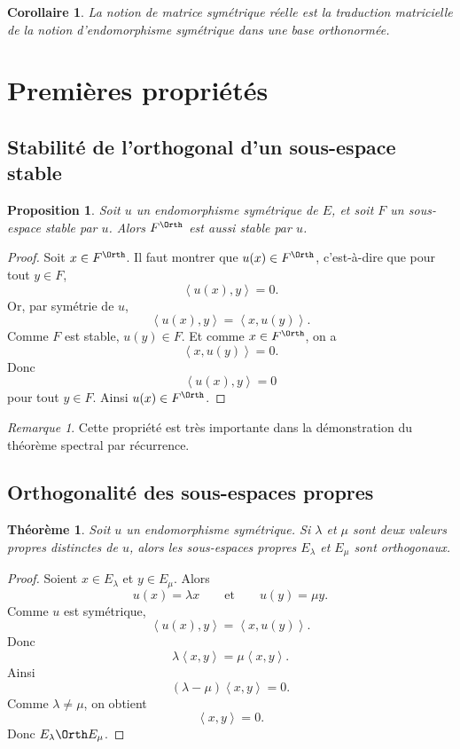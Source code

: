 \documentclass[11pt,a4paper]{article}
\newtheorem{theoreme}[definition]{Théorème}
\newtheorem{proposition}[definition]{Proposition}
\newtheorem{corollaire}[definition]{Corollaire}
\theoremstyle{remark}
\newtheorem{remarque}[definition]{Remarque}
\newcommand{\scal}[2]{\left\langle #1,#2\right\rangle}
\begin{document}
\begin{corollaire}
La notion de matrice symétrique réelle est la traduction matricielle de la notion d’endomorphisme symétrique dans une base orthonormée.
\end{corollaire}

\section{Premières propriétés}

\subsection{Stabilité de l’orthogonal d’un sous-espace stable}

\begin{proposition}
Soit \(u\) un endomorphisme symétrique de \(E\), et soit \(F\) un sous-espace stable par \(u\). Alors \(F^\Orth\) est aussi stable par \(u\).
\end{proposition}

\begin{proof}
Soit \(x\in F^\Orth\). Il faut montrer que \(u(x)\in F^\Orth\), c’est-à-dire que pour tout \(y\in F\),
\[
\scal{u(x)}{y}=0.
\]
Or, par symétrie de \(u\),
\[
\scal{u(x)}{y}=\scal{x}{u(y)}.
\]
Comme \(F\) est stable, \(u(y)\in F\). Et comme \(x\in F^\Orth\), on a
\[
\scal{x}{u(y)}=0.
\]
Donc
\[
\scal{u(x)}{y}=0
\]
pour tout \(y\in F\). Ainsi \(u(x)\in F^\Orth\).
\end{proof}

\begin{remarque}
Cette propriété est très importante dans la démonstration du théorème spectral par récurrence.
\end{remarque}

\subsection{Orthogonalité des sous-espaces propres}

\begin{theoreme}
Soit \(u\) un endomorphisme symétrique. Si \(\lambda\) et \(\mu\) sont deux valeurs propres distinctes de \(u\), alors les sous-espaces propres \(E_\lambda\) et \(E_\mu\) sont orthogonaux.
\end{theoreme}

\begin{proof}
Soient \(x\in E_\lambda\) et \(y\in E_\mu\). Alors
\[
u(x)=\lambda x
\qquad \text{et} \qquad
u(y)=\mu y.
\]
Comme \(u\) est symétrique,
\[
\scal{u(x)}{y}=\scal{x}{u(y)}.
\]
Donc
\[
\lambda \scal{x}{y}=\mu \scal{x}{y}.
\]
Ainsi
\[
(\lambda-\mu)\scal{x}{y}=0.
\]
Comme \(\lambda\neq \mu\), on obtient
\[
\scal{x}{y}=0.
\]
Donc \(E_\lambda\Orth E_\mu\).
\end{proof}
\end{document}
